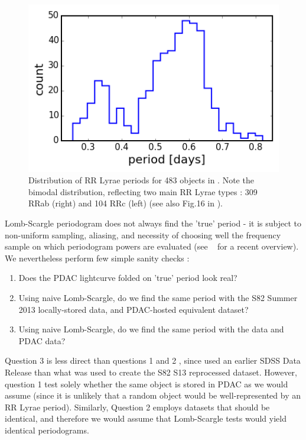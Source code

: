 \documentclass[fleqn,usenatbib]{mnras} %
\begin{document}
\begin{figure}
\includegraphics[width=\columnwidth]{figs/Fig_1_Sesar_2010_RRLyr}
\caption{ Distribution of RR Lyrae periods  for 483 objects in \citep{sesar2010}. Note the bimodal distribution, reflecting two main RR Lyrae types : 309 RRab (right) and 104 RRc (left) (see also Fig.16 in \citep{sesar2010}).}
\label{fig:RRLyr_distribution}
\end{figure}

Lomb-Scargle periodogram does not always find the 'true' period - it is subject to non-uniform sampling,  aliasing,  and necessity of choosing well the frequency sample on which periodogram powers are evaluated (see ~\cite{vanderplas2017} for a recent overview). We nevertheless perform few simple sanity checks : 
\begin{enumerate}
	\item  Does the PDAC lightcurve folded on 'true' period look real? 
	\item  Using naive Lomb-Scargle, do we find the same period with the S82 Summer 2013 locally-stored data, and PDAC-hosted equivalent dataset?  
	\item  Using naive Lomb-Scargle, do we find the same period with the \cite{sesar2010} data and PDAC data?
	
\end{enumerate}


Question 3 is less direct than  questions 1 and 2 , since \cite{sesar2010} used an earlier SDSS Data Release than what was used to create the S82 S13 reprocessed dataset.  However,  question 1 test solely  whether the same object is stored in PDAC as we would assume (since it is unlikely that a random object would be well-represented by an RR Lyrae period). Similarly, Question 2 employs datasets that should be identical, and therefore we would assume that Lomb-Scargle tests would yield identical periodograms.  
\end{document}
